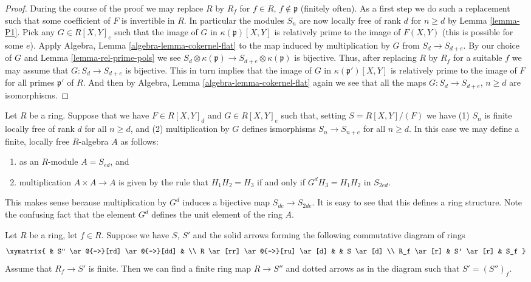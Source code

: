 \begin{proof}
During the course of the proof we may replace $R$ by $R_f$
for $f\in R$, $f\not\in \mathfrak p$ (finitely often).
As a first step we do such a replacement such that
some coefficient of $F$ is invertible in $R$.
In particular the modules $S_n$ are now locally
free of rank $d$ for $n \geq d$ by Lemma \ref{lemma-P1}.
Pick any $G \in R[X, Y]_e$ such that the image of
$G$ in $\kappa(\mathfrak p)[X, Y]$ is relatively
prime to the image of $F(X, Y)$ (this is possible for some $e$).
Apply Algebra, Lemma \ref{algebra-lemma-cokernel-flat} to the map
induced by multiplication by $G$ from $S_d \to S_{d + e}$.
By our choice of $G$ and Lemma \ref{lemma-rel-prime-pols}
we see
$S_d \otimes \kappa(\mathfrak p) \to S_{d + e} \otimes \kappa(\mathfrak p)$
is bijective. Thus, after replacing $R$ by $R_f$ for a suitable
$f$ we may assume that $G : S_d \to S_{d + e}$
is bijective. This in turn implies that the image
of $G$ in $\kappa(\mathfrak p')[X, Y]$ is relatively
prime to the image of $F$ for all primes $\mathfrak p'$
of $R$. And then by Algebra, Lemma \ref{algebra-lemma-cokernel-flat}
again we see that all the maps
$G : S_d \to S_{d + e}$, $n \geq d$ are isomorphisms.
\end{proof}

\begin{remark}
\label{remark-algebra}
Let $R$ be a ring. Suppose that we have $F \in R[X, Y]_d$
and $G \in R[X, Y]_e$ such that, setting $S = R[X, Y]/(F)$
we have (1) $S_n$ is finite locally free of rank $d$ for
all $n \geq d$, and (2) multiplication by $G$ defines
ismorphisms $S_n \to S_{n + e}$ for all $n \geq d$. In this
case we may define a finite, locally free $R$-algebra
$A$ as follows:
\begin{enumerate}
\item as an $R$-module $A = S_{ed}$, and
\item multiplication $A \times A \to A$ is given by
the rule that $H_1 H_2 = H_3$ if and only if $G^d H_3 = H_1 H_2$
in $S_{2ed}$.
\end{enumerate}
This makes sense because multiplication by $G^d$
induces a bijective map $S_{de} \to S_{2de}$.
It is easy to see that this defines a ring structure.
Note the confusing fact that the element $G^d$
defines the unit element of the ring $A$.
\end{remark}

\begin{lemma}
\label{lemma-finite-after-localization}
Let $R$ be a ring, let $f \in R$.
Suppose we have $S$, $S'$ and the solid arrows
forming the following commutative diagram of rings
$$
\xymatrix{
& S'' \ar@{-->}[rd] \ar@{-->}[dd] &
\\
R \ar[rr] \ar@{-->}[ru] \ar[d] &  & S \ar[d]
\\
R_f \ar[r] & S' \ar[r] & S_f
}
$$
Assume that $R_f \to S'$ is finite. Then we can find
a finite ring map $R \to S''$ and dotted arrows as
in the diagram such that $S' = (S'')_f$.
\end{lemma}


